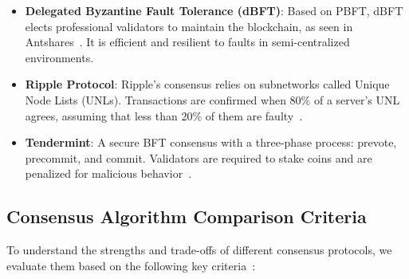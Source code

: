 \begin{itemize}
  \item \textbf{Delegated Byzantine Fault Tolerance (dBFT)}: Based on PBFT, dBFT elects professional validators to maintain the blockchain, as seen in Antshares~\cite{antshares2016}. It is efficient and resilient to faults in semi-centralized environments.

  \item \textbf{Ripple Protocol}: Ripple's consensus relies on subnetworks called Unique Node Lists (UNLs). Transactions are confirmed when 80\% of a server's UNL agrees, assuming that less than 20\% of them are faulty~\cite{schwartz2014ripple}.

  \item \textbf{Tendermint}: A secure BFT consensus with a three-phase process: prevote, precommit, and commit. Validators are required to stake coins and are penalized for malicious behavior~\cite{kwon2014tendermint}.
\end{itemize}

\subsection{Consensus Algorithm Comparison Criteria}

To understand the strengths and trade-offs of different consensus protocols, we evaluate them based on the following key criteria~\cite{vukolic2015scalability}:

